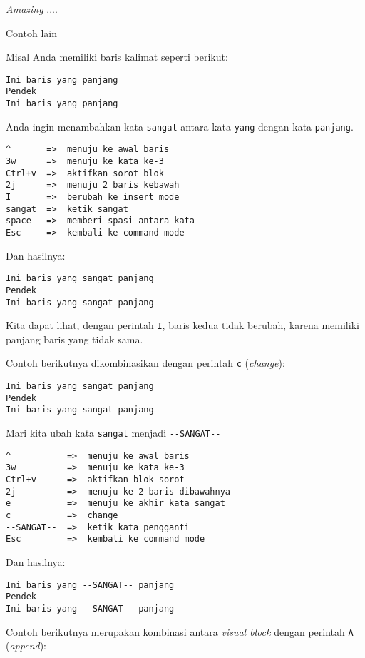 \documentclass{article}
\begin{document}
\emph{Amazing} ....

Contoh lain

Misal Anda memiliki baris kalimat seperti berikut:

\begin{verbatim}
Ini baris yang panjang
Pendek
Ini baris yang panjang
\end{verbatim}

Anda ingin menambahkan kata \verb=sangat= antara kata
\verb=yang= dengan kata \verb=panjang=.

\begin{verbatim}
^       =>  menuju ke awal baris
3w      =>  menuju ke kata ke-3
Ctrl+v  =>  aktifkan sorot blok
2j      =>  menuju 2 baris kebawah
I       =>  berubah ke insert mode
sangat  =>  ketik sangat
space   =>  memberi spasi antara kata
Esc     =>  kembali ke command mode
\end{verbatim}

Dan hasilnya:

\begin{verbatim}
Ini baris yang sangat panjang
Pendek
Ini baris yang sangat panjang
\end{verbatim}

Kita dapat lihat, dengan perintah \verb=I=, baris kedua
tidak berubah, karena memiliki panjang baris yang tidak
sama.

Contoh berikutnya dikombinasikan dengan perintah \verb=c=
(\emph{change}):

\begin{verbatim}
Ini baris yang sangat panjang
Pendek
Ini baris yang sangat panjang
\end{verbatim}

Mari kita ubah kata \verb=sangat= menjadi \verb=--SANGAT--=

\begin{verbatim}
^           =>  menuju ke awal baris
3w          =>  menuju ke kata ke-3
Ctrl+v      =>  aktifkan blok sorot
2j          =>  menuju ke 2 baris dibawahnya
e           =>  menuju ke akhir kata sangat
c           =>  change
--SANGAT--  =>  ketik kata pengganti
Esc         =>  kembali ke command mode
\end{verbatim}

Dan hasilnya:

\begin{verbatim}
Ini baris yang --SANGAT-- panjang
Pendek
Ini baris yang --SANGAT-- panjang
\end{verbatim}

Contoh berikutnya merupakan kombinasi antara \emph{visual
block} dengan perintah \verb=A= (\emph{append}):
\end{document}
